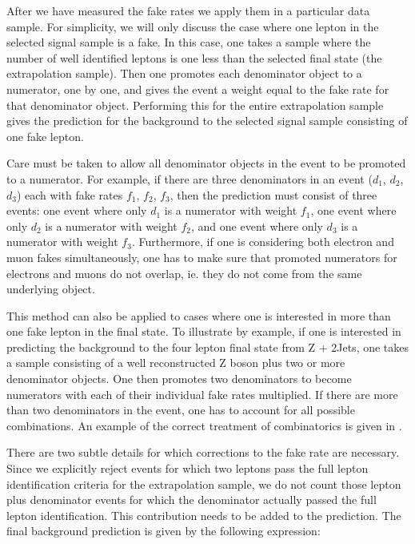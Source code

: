 \documentclass{cmspaper}
\begin{document}
After we have measured the fake rates we apply them in a particular data sample. For simplicity, we will only discuss the case where one lepton in the selected signal sample is a fake. In this case, one takes a sample where the number of well identified leptons is one less than the selected final state (the extrapolation sample). Then one promotes each denominator object to a numerator, one by one, and gives the event a weight equal to the fake rate for that denominator object. Performing this for the entire extrapolation sample gives the prediction for the background to the selected signal sample consisting of one fake lepton. 

Care must be taken to allow all denominator objects in the event to be promoted to a numerator. For example, if there are three denominators in an event ($d_1$, $d_2$, $d_3$) each with fake rates $f_1$, $f_2$, $f_3$, then the prediction must consist of three events: one event where only $d_1$ is a numerator with weight $f_1$, one event where only $d_2$ is a numerator with weight $f_2$, and one event where only $d_3$ is a numerator with weight $f_3$. Furthermore, if one is considering both electron and muon fakes simultaneously, one has to make sure that promoted numerators for electrons and muons do not overlap, ie. they do not come from the same underlying object. 

This method can also be applied to cases where one is interested in more than one fake lepton in the final state. To illustrate by example, if one is interested in predicting the background to the four lepton final state from Z + 2Jets, one takes a sample consisting of a well reconstructed Z boson plus two or more denominator objects. One then promotes two denominators to become numerators with each of their individual fake rates multiplied. If there are more than two denominators in the event, one has to account for all possible combinations. An example of the correct treatment of combinatorics is given in .

There are two subtle details for which corrections to the fake rate are necessary. Since we explicitly reject events for which two leptons pass the full lepton identification criteria for the extrapolation sample, we do not count those lepton plus denominator events for which the denominator actually passed the full lepton identification. This contribution needs to be added to the prediction. The final background prediction is given by the following expression:
\end{document}
